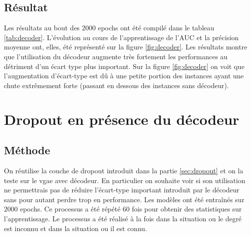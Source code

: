 \documentclass{article}
\begin{document}
\subsection{Résultat}
Les résultats au bout des 2000 epochs ont été compilé dans le tableau \ref{tab:decoder}.
L'évolution au cours de l'apprentissage de l'AUC et la précision moyenne ont, elles, été représenté sur la figure \ref{fig:decoder}.
Les résultats montre que l'utilisation du décodeur augmente très fortement les performances au détriment d'un écart type plus important. 
Sur la figure \ref{fig:decoder} on voit que l'augmentation d'écart-type est dû à une petite portion des instances ayant une chute extrêmement forte (passant en dessous des instances sans décodeur).
\begin{table}[H]
    \captionsetup{justification=centering}
    \caption{Résultats de l'utilisation d'un décodeur. \\ \footnotesize Dans chaque case est indiquée la moyenne et l'écart-type au format : moyenne(écart-type)}
    \label{tab:decoder}
\end{table}

\section{Dropout en présence du décodeur}
\subsection{Méthode}
On réutilise la couche de dropout introduit dans la partie \ref{sec:dropout} et on la teste sur le vgae avec décodeur.
En particulier on souhaite voir si son utilisation ne permettrais pas de réduire l'écart-type important introduit par le décodeur sans pour autant perdre trop en performance. 
Les modèles ont été entraînés sur 2000 epochs. 
Ce processus a été répété 60 fois pour obtenir des statistiques sur l'apprentissage.
Le processus a été réalisé à la fois dans la situation ou le degré est inconnu et dans la situation ou il est connu.
\end{document}
